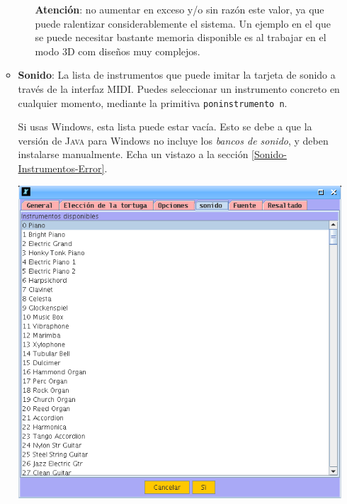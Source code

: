 \begin{itemize}
\begin{itemize}
\begin{itemize}
                  \textbf{Atenci\'on}: no aumentar en exceso y/o sin raz\'on
                  este valor, ya que puede ralentizar considerablemente el
                  sistema. Un ejemplo en el que se puede necesitar bastante
                  memoria disponible es al trabajar en el modo 3D com dise\~nos
                  muy complejos.
            \end{itemize}
         \item \textbf{Sonido}:  La lista de instrumentos que
            puede imitar la tarjeta de sonido a trav\'es de la interfaz
            MIDI.  Puedes seleccionar un instrumento concreto
            en cualquier momento, mediante la primitiva 
            \texttt{poninstrumento n}.

            Si usas Windows, esta lista puede estar vac\'ia. Esto se debe
            a que la versi\'on de \textsc{Java} para Windows no incluye los
            \textit{bancos de sonido}, y deben instalarse manualmente. Echa
            un vistazo a la secci\'on \ref{Sonido-Instrumentos-Error}.
            \begin{center}
               \includegraphics[scale=0.3]{Imagenes/03_Opciones-Menu/Preferencias_04.png}
         \hfill

\end{center}
\end{itemize}
\end{itemize}
